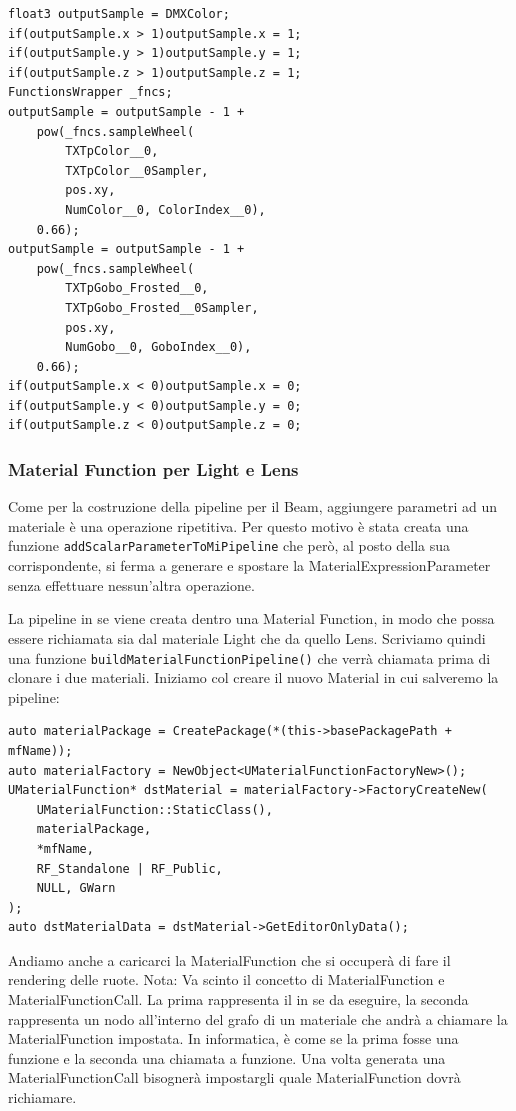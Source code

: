 \documentclass[main.tex]{subfiles}
\begin{document}
\lstset{language=glsl}
\begin{lstlisting}
float3 outputSample = DMXColor;
if(outputSample.x > 1)outputSample.x = 1;
if(outputSample.y > 1)outputSample.y = 1;
if(outputSample.z > 1)outputSample.z = 1;
FunctionsWrapper _fncs;
outputSample = outputSample - 1 +
    pow(_fncs.sampleWheel(
        TXTpColor__0,
        TXTpColor__0Sampler,
        pos.xy,
        NumColor__0, ColorIndex__0),
    0.66);
outputSample = outputSample - 1 +
    pow(_fncs.sampleWheel(
        TXTpGobo_Frosted__0,
        TXTpGobo_Frosted__0Sampler,
        pos.xy,
        NumGobo__0, GoboIndex__0),
    0.66);
if(outputSample.x < 0)outputSample.x = 0;
if(outputSample.y < 0)outputSample.y = 0;
if(outputSample.z < 0)outputSample.z = 0;
\end{lstlisting}
\clearpage %

\subsubsection{Material Function per Light e Lens}\label{subsec:2_3_MF}
Come per la costruzione della pipeline per il Beam, aggiungere parametri ad un materiale è una operazione ripetitiva. Per questo motivo è stata creata una funzione \lstinline{addScalarParameterToMiPipeline} che però, al posto della sua corrispondente, si ferma a generare e spostare la MaterialExpressionParameter senza effettuare nessun'altra operazione. \newline

La pipeline in se viene creata dentro una Material Function, in modo che possa essere richiamata sia dal materiale Light che da quello Lens. Scriviamo quindi una funzione \lstinline{buildMaterialFunctionPipeline()} che verrà chiamata prima di clonare i due materiali. Iniziamo col creare il nuovo Material in cui salveremo la pipeline:
\lstset{language=UEcpp}
\begin{lstlisting}
auto materialPackage = CreatePackage(*(this->basePackagePath + mfName));
auto materialFactory = NewObject<UMaterialFunctionFactoryNew>();
UMaterialFunction* dstMaterial = materialFactory->FactoryCreateNew(
    UMaterialFunction::StaticClass(),
    materialPackage,
    *mfName,
    RF_Standalone | RF_Public,
    NULL, GWarn
);
auto dstMaterialData = dstMaterial->GetEditorOnlyData();
\end{lstlisting}
Andiamo anche a caricarci la MaterialFunction che si occuperà di fare il rendering delle ruote. Nota: Va scinto il concetto di MaterialFunction e MaterialFunctionCall. La prima rappresenta il  in se da eseguire, la seconda rappresenta un nodo all'interno del grafo di un materiale che andrà a chiamare la MaterialFunction impostata. In informatica, è come se la prima fosse una funzione e la seconda una chiamata a funzione. Una volta generata una MaterialFunctionCall bisognerà impostargli quale MaterialFunction dovrà richiamare.
\end{document}
